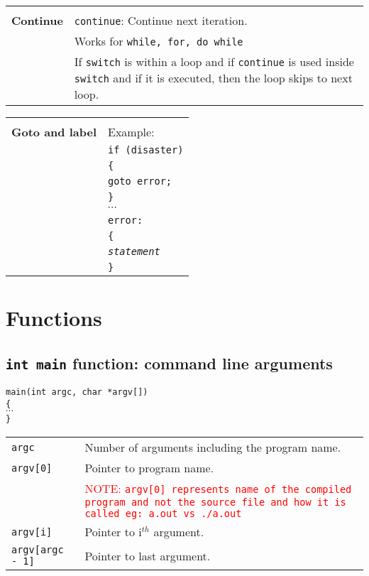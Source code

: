 \begin{multicols*}{3}
\begin{tabularx}{\linewidth}{l|X}
\hline \\

\textbf{Continue} & \texttt{continue}: Continue next iteration.\\
& Works for \texttt{while, for, do while}\\
& If \texttt{switch} is within a loop and if \texttt{continue} is used inside \texttt{switch} and if it is executed, then the loop skips to next loop.\\

\hline
\end{tabularx}


\begin{tabularx}{\linewidth}{l|X}
\hline\\

\textbf{Goto and label} & Example:\\
& \texttt{if (disaster)}\\
& \texttt{\{}\\
& \texttt{\qquad goto error;}\\
& \texttt{\}}\\
& $\cdots$\\
& \texttt{error:}\\
& \texttt{\{}\\
& \texttt{\qquad \textit{statement}}\\
& \texttt{\}}\\
\hline
\end{tabularx}


\vfill \null
\columnbreak


\section{Functions}

\subsection{\texttt{int main} function: command line arguments}

\texttt{main(int argc, char *argv[])}\\
\texttt{\{}\\
\qquad \texttt{$\cdots$}\\
\texttt{\}}

\begin{tabularx}{\linewidth}{l|X}
\texttt{argc} & Number of arguments including the program name. \\
\texttt{argv[0]} & Pointer to program name.\\
& \textcolor{red}{NOTE: \texttt{argv[0] represents name of the compiled program and not the source file and how it is called eg: \texttt{a.out} vs \texttt{./a.out}}}\\
\texttt{argv[i]} & Pointer to i$^{th}$ argument.\\
\texttt{argv[argc - 1]} & Pointer to last argument. \\
\end{tabularx}





\end{multicols*}
